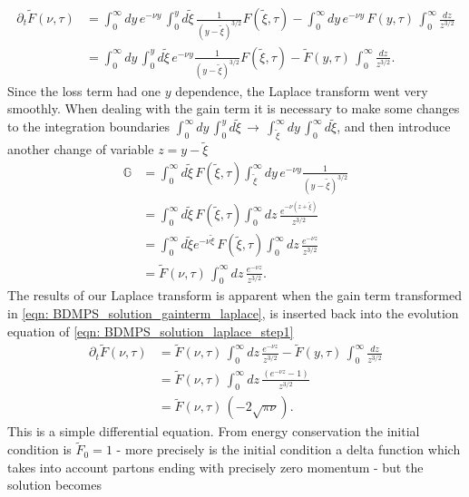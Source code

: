 \documentclass[main.tex]{subfiles}
\begin{document}
\begin{align}\label{eqn: BDMPS_solution_laplace_step1}
    \partial_t \tilde{F}(\nu,\tau) &= \int_0^\infty dy\, e^{-\nu y}\,  \int_0^{y} d\tilde{\xi} \, \frac{1}{(y-\tilde{\xi})^{3/2}} F(\tilde{\xi}, \tau) - \int_0^\infty dy \, e^{-\nu y}\, F(y,\tau) \, \int_0^\infty \frac{dz}{z^{3/2}} \nonumber \\
    &= \int_0^\infty dy\, \int_0^{y} d\tilde{\xi} \, e^{-\nu y} \frac{1}{(y-\tilde{\xi})^{3/2}} F(\tilde{\xi}, \tau) - \tilde{F}(y,\tau) \, \int_0^\infty \frac{dz}{z^{3/2}}.
\end{align}
Since the loss term had one \(y\) dependence, the Laplace transform went very smoothly. When dealing with the gain term it is necessary to make some changes to the integration boundaries \(\int_0^\infty dy\, \int_0^y d\tilde{\xi} \,\rightarrow\, \int_{\tilde{\xi}}^\infty dy\, \int_0^\infty d\tilde{\xi}\), and then introduce another change of variable \(z = y-\tilde{\xi}\)
\begin{align}\label{eqn: BDMPS_solution_gainterm_laplace}
    \mathbb{G} &= \int_0^{\infty} d\tilde{\xi} \,F(\tilde{\xi}, \tau) \int_{\tilde{\xi}} ^\infty dy\,  e^{-\nu y} \frac{1}{(y-\tilde{\xi})^{3/2}} \nonumber \\
    &= \int_0^{\infty} d\tilde{\xi} \,F(\tilde{\xi}, \tau) \int_0^\infty dz\, \frac{e^{-\nu (z+\tilde{\xi})}}{z^{3/2}} \nonumber \\
    &= \int_0^{\infty} d\tilde{\xi} e^{-\nu \tilde{\xi}} \,F(\tilde{\xi}, \tau) \int_0^\infty dz\, \frac{e^{-\nu z}}{z^{3/2}} \nonumber \\
    &= \tilde{F}(\nu, \tau) \, \int_0^\infty dz\, \frac{e^{-\nu z}}{z^{3/2}}. 
\end{align}
The results of our Laplace transform is apparent when the gain term transformed in \autoref{eqn: BDMPS_solution_gainterm_laplace}, is inserted back into the evolution equation of \autoref{eqn: BDMPS_solution_laplace_step1}
\begin{align}\label{eqn: BDMPS_solution_laplace_step2}
    \partial_t \tilde{F}(\nu,\tau) &= \tilde{F}(\nu, \tau) \, \int_0^\infty dz\, \frac{e^{-\nu z}}{z^{3/2}} - \tilde{F}(y,\tau) \, \int_0^\infty \frac{dz}{z^{3/2}} \nonumber \\
    &= \tilde{F}(\nu, \tau) \, \int_0^\infty dz\, \frac{(e^{-\nu z}-1)}{z^{3/2}} \nonumber \\
    &= \tilde{F}(\nu, \tau) \, (-2 \sqrt{\pi \nu}).
\end{align}
This is a simple differential equation. From energy conservation the initial condition is \(\tilde{F}_0 = 1\) - more precisely is the initial condition a delta function which takes into account partons ending with precisely zero momentum - but the solution becomes
\end{document}
